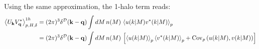 \documentclass{article}
\begin{document}
Using the same approximation, the 1-halo term reads:
\begin{align}
  \left\langle U_{\bf k}V^*_{\bf q}\right\rangle_{p,H,\delta}^{1h}&=(2\pi)^3\delta^{\cal D}({\bf k}-{\bf q})\int dM\,n(M)\,\left\langle u(k|M) v^*(k|M)\right\rangle_p\\
  &=(2\pi)^3\delta^{\cal D}({\bf k}-{\bf q})\int dM\,n(M)\,\left[\left\langle u(k|M)\right\rangle_p\left\langle v^*(k|M)\right\rangle_p+{\rm Cov}_p\left(u(k|M),v(k|M)\right)\right]
\end{align}



\end{document}
